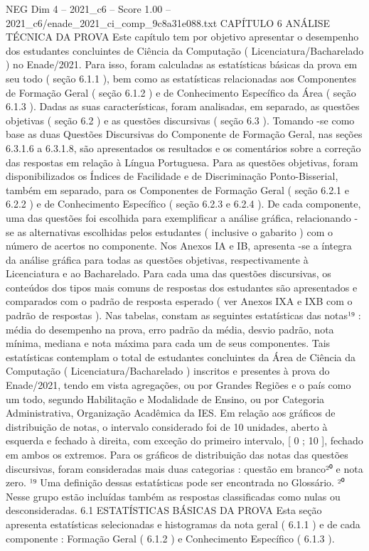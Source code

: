 \begin{textsample}{NEG Dim 4 – 2021\_c6 – Score 1.00 – 2021\_c6/enade\_2021\_ci\_comp\_9c8a31e088.txt}  \label{ex:f4_neg_298}
CAPÍTULO 6 ANÁLISE TÉCNICA DA PROVA Este capítulo tem por objetivo apresentar o desempenho dos estudantes concluintes de Ciência da Computação ( Licenciatura/Bacharelado ) no Enade/2021.
Para isso, foram calculadas as estatísticas básicas da prova em seu todo ( seção 6.1.1 ), bem como as estatísticas relacionadas aos Componentes de Formação Geral ( seção 6.1.2 ) e de Conhecimento Específico da Área ( seção 6.1.3 ).
Dadas as suas características, foram analisadas, em separado, as questões objetivas ( seção 6.2 ) e as questões discursivas ( seção 6.3 ).
Tomando -se como base as duas Questões Discursivas do Componente de Formação Geral, nas seções 6.3.1.6 a 6.3.1.8, são apresentados os resultados e os comentários sobre a correção das respostas em relação à Língua Portuguesa.
Para as questões objetivas, foram disponibilizados os Índices de Facilidade e de Discriminação Ponto-Bisserial, também em separado, para os Componentes de Formação Geral ( seção 6.2.1 e 6.2.2 ) e de Conhecimento Específico ( seção 6.2.3 e 6.2.4 ).
De cada componente, uma das questões foi escolhida para exemplificar a análise gráfica, relacionando -se as alternativas escolhidas pelos estudantes ( inclusive o gabarito ) com o número de acertos no componente.
Nos Anexos IA e IB, apresenta -se a íntegra da análise gráfica para todas as questões objetivas, respectivamente à Licenciatura e ao Bacharelado.
Para cada uma das questões discursivas, os conteúdos dos tipos mais comuns de respostas dos estudantes são apresentados e comparados com o padrão de resposta esperado ( ver Anexos IXA e IXB com o padrão de respostas ).
Nas tabelas, constam as seguintes estatísticas das notas¹⁹ : média do desempenho na prova, erro padrão da média, desvio padrão, nota mínima, mediana e nota máxima para cada um de seus componentes.
Tais estatísticas contemplam o total de estudantes concluintes da Área de Ciência da Computação ( Licenciatura/Bacharelado ) inscritos e presentes à prova do Enade/2021, tendo em vista agregações, ou por Grandes Regiões e o país como um todo, segundo Habilitação e Modalidade de Ensino, ou por Categoria Administrativa, Organização Acadêmica da IES.
Em relação aos gráficos de distribuição de notas, o intervalo considerado foi de 10 unidades, aberto à esquerda e fechado à direita, com exceção do primeiro intervalo, [ 0 ; 10 ], fechado em ambos os extremos.
Para os gráficos de distribuição das notas das questões discursivas, foram consideradas mais duas categorias : questão em branco²⁰ e nota zero. ¹⁹ Uma definição dessas estatísticas pode ser encontrada no Glossário. ²⁰ Nesse grupo estão incluídas também as respostas classificadas como nulas ou desconsideradas. 6.1 ESTATÍSTICAS BÁSICAS DA PROVA Esta seção apresenta estatísticas selecionadas e histogramas da nota geral ( 6.1.1 ) e de cada componente : Formação Geral ( 6.1.2 ) e Conhecimento Específico ( 6.1.3 ).

\end{textsample}
